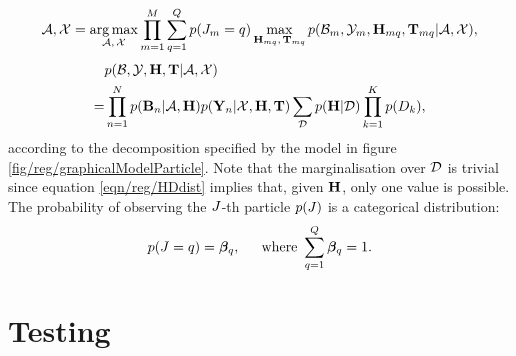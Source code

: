 \begin{equation}
	\mathcal{A},\mathcal{X} = \operatorname*{arg\,max}_{\mathcal{A},\,\mathcal{X}}
	\prod_{m=1}^M \sum_{q = 1}^{Q} 
	p({J}_{m} = q)
	\max_{\mathbf{H}_{mq},\,\mathbf{T}_{mq}} p(\mathcal{B}_m,\mathcal{Y}_m,\mathbf{H}_{mq},\mathbf{T}_{mq}|\mathcal{A},\mathcal{X}), 
	\label{eqn/reg/particleapproximation}
\end{equation}
\begin{equation}
	\begin{aligned}
	& p(\mathcal{B},\mathcal{Y},\mathbf{H},\mathbf{T}|\mathcal{A},\mathcal{X}) \\  
	= & \prod_{n=1}^N
	p(\mathbf{B}_{n}|\mathcal{A},\mathbf{H})
	p(\mathbf{Y}_{n}|\mathcal{X},\mathbf{H},\mathbf{T})
	\sum_{\mathcal{D}}
	p(\mathbf{H}|\mathcal{D})
	\prod_{k=1}^K
	p({D}_{k}),
	\end{aligned}
	\label{eqn/reg/decompose}
\end{equation}
according to the decomposition specified by the model in figure \ref{fig/reg/graphicalModelParticle}.
Note that the marginalisation over $\mathcal{D}$ is trivial since equation \ref{eqn/reg/HDdist} implies that, given $\mathbf{H}$, only one value is possible. 
The probability of observing the ${J}$-th particle $p({J})$ is a categorical distribution:
\begin{equation}
	\begin{aligned}
		p({J} = q) & = \bm{\beta}_q, & ~ \mbox{ where }   \sum_{q=1}^Q \bm{\beta}_q = 1. 
	\end{aligned}
\end{equation}

\section{Testing}

